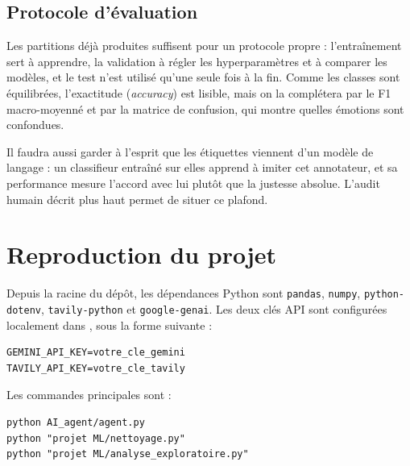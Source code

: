 \documentclass[11pt,a4paper]{article}
\DeclareRobustCommand{\file}[1]{{\small\urlstyle{tt}\path{#1}}}
\begin{document}
\subsection{Protocole d'évaluation}
Les partitions déjà produites suffisent pour un protocole propre : l'entraînement sert à apprendre, la validation à régler les hyperparamètres et à comparer les modèles, et le test n'est utilisé qu'une seule fois à la fin. Comme les classes sont équilibrées, l'exactitude (\emph{accuracy}) est lisible, mais on la complétera par le F1 macro-moyenné et par la matrice de confusion, qui montre quelles émotions sont confondues.

Il faudra aussi garder à l'esprit que les étiquettes viennent d'un modèle de langage : un classifieur entraîné sur elles apprend à imiter cet annotateur, et sa performance mesure l'accord avec lui plutôt que la justesse absolue. L'audit humain décrit plus haut permet de situer ce plafond.

\section{Reproduction du projet}
Depuis la racine du dépôt, les dépendances Python sont \texttt{pandas}, \texttt{numpy}, \texttt{python-dotenv}, \texttt{tavily-python} et \texttt{google-genai}. Les deux clés API sont configurées localement dans \file{AI_agent/.env}, sous la forme suivante :

\begin{tcolorbox}[enhanced,colback=mist,colframe=mist,borderline west={3pt}{0pt}{navy},
  arc=2pt,left=10pt,top=5pt,bottom=5pt]
\begin{lstlisting}[style=cmd]
GEMINI_API_KEY=votre_cle_gemini
TAVILY_API_KEY=votre_cle_tavily
\end{lstlisting}
\end{tcolorbox}

Les commandes principales sont :

\begin{tcolorbox}[enhanced,colback=mist,colframe=mist,borderline west={3pt}{0pt}{navy},
  arc=2pt,left=10pt,top=5pt,bottom=5pt]
\begin{lstlisting}[style=cmd]
python AI_agent/agent.py
python "projet ML/nettoyage.py"
python "projet ML/analyse_exploratoire.py"
\end{lstlisting}
\end{tcolorbox}
\end{document}
